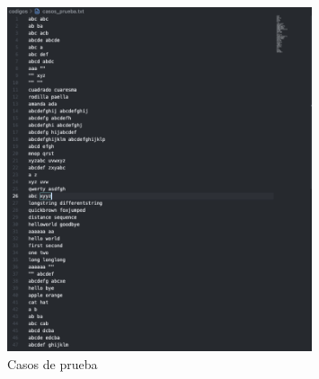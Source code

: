\begin{figure}[H]
    \centering
    \includegraphics[width=0.8\textwidth]{images/teststrings.png}
    \caption{Casos de prueba}
    \label{fig:teststrings}
\end{figure}


